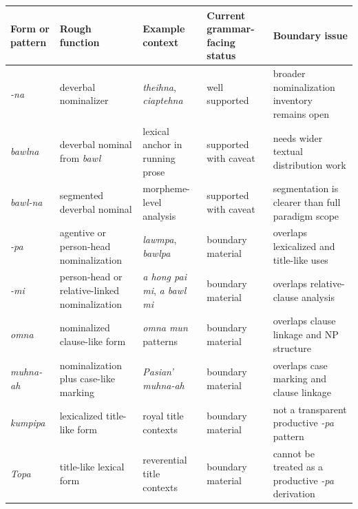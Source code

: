 \documentclass[
  11pt,
  a4paper,
]{article}
\newcounter{none} %
\newcommand{\tdim}[1]{\textit{#1}}
\begin{document}
{\def\LTcaptype{none} %
\begin{longtable}[]{@{}
  >{\raggedright\arraybackslash}p{}
  >{\raggedright\arraybackslash}p{}
  >{\raggedright\arraybackslash}p{}
  >{\raggedright\arraybackslash}p{}
  >{\raggedright\arraybackslash}p{}@{}}
\toprule\noalign{}
\begin{minipage}[b]{\linewidth}\raggedright
Form or pattern
\end{minipage} & \begin{minipage}[b]{\linewidth}\raggedright
Rough function
\end{minipage} & \begin{minipage}[b]{\linewidth}\raggedright
Example context
\end{minipage} & \begin{minipage}[b]{\linewidth}\raggedright
Current grammar-facing status
\end{minipage} & \begin{minipage}[b]{\linewidth}\raggedright
Boundary issue
\end{minipage} \\
\midrule\noalign{}
\endhead
\bottomrule\noalign{}
\endlastfoot
\tdim{-na} & deverbal nominalizer & \tdim{theihna}, \tdim{ciaptehna} &
well supported & broader nominalization inventory remains open \\
\tdim{bawlna} & deverbal nominal from \tdim{bawl} & lexical anchor in
running prose & supported with caveat & needs wider textual distribution
work \\
\tdim{bawl-na} & segmented deverbal nominal & morpheme-level analysis &
supported with caveat & segmentation is clearer than full paradigm
scope \\
\tdim{-pa} & agentive or person-head nominalization & \tdim{lawmpa},
\tdim{bawlpa} & boundary material & overlaps lexicalized and title-like
uses \\
\tdim{-mi} & person-head or relative-linked nominalization &
\tdim{a hong pai mi}, \tdim{a bawl mi} & boundary material & overlaps
relative-clause analysis \\
\tdim{omna} & nominalized clause-like form & \tdim{omna mun} patterns &
boundary material & overlaps clause linkage and NP structure \\
\tdim{muhna-ah} & nominalization plus case-like marking &
\tdim{Pasian' muhna-ah} & boundary material & overlaps case marking and
clause linkage \\
\tdim{kumpipa} & lexicalized title-like form & royal title contexts &
boundary material & not a transparent productive \tdim{-pa} pattern \\
\tdim{Topa} & title-like lexical form & reverential title contexts &
boundary material & cannot be treated as a productive \tdim{-pa}
derivation \\
\end{longtable}
}
\end{document}
